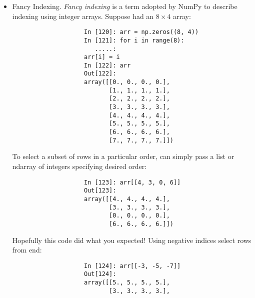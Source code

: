 \documentclass{article}
\newtheorem{remark}{Remark}
\begin{document}
\begin{enumerate}
\begin{itemize}
\begin{itemize}
\begin{itemize}
				\begin{remark}
					Python keywords {\tt and, or} do not work with Boolean arrays. Use {\tt\&} (and) \& {\tt|} (or) instead.
				\end{remark}
				Setting values with Boolean arrays works by substituting value or values on RHS into locations where Boolean array's  values are {\tt True}. To set all of negative value in {\tt data} to 0, need only do:
				\begin{verbatim}
					In [116]: data[data < 0] = 0
					In [117]: data
					Out[117]:
					array([[4, 7],
					       [0, 2],
					       [0, 6],
					       [0, 0],
					       [1, 2],
					       [0, 0],
					       [3, 4]])
				\end{verbatim}
				Can also set whole rows or columns using a 1D Boolean array:
				\begin{verbatim}
					In [118]: data[names != "Joe"] = 7
					In [119]: data
					Out[119]:
					array([[7, 7],
					       [0, 2],
					       [7, 7],
					       [7, 7],
					       [7, 7],
					       [0, 0],
					       [3, 4]])
				\end{verbatim}
				These types of operations on 2D data are convenient to do with pandas.
				\item {\sf Fancy Indexing.} {\it Fancy indexing} is a term adopted by NumPy to describe indexing using integer arrays. Suppose had an $8\times4$ array:
				\begin{verbatim}
					In [120]: arr = np.zeros((8, 4))
					In [121]: for i in range(8):
					   .....:
					arr[i] = i
					In [122]: arr
					Out[122]:
					array([[0., 0., 0., 0.],
					       [1., 1., 1., 1.],
					       [2., 2., 2., 2.],
					       [3., 3., 3., 3.],
					       [4., 4., 4., 4.],
					       [5., 5., 5., 5.],
					       [6., 6., 6., 6.],
					       [7., 7., 7., 7.]])
				\end{verbatim}
				To select a subset of rows in a particular order, can simply pass a list or ndarray of integers specifying desired order:
				\begin{verbatim}
					In [123]: arr[[4, 3, 0, 6]]
					Out[123]:
					array([[4., 4., 4., 4.],
					       [3., 3., 3., 3.],
					       [0., 0., 0., 0.],
					       [6., 6., 6., 6.]])
				\end{verbatim}
				Hopefully this code did what you expected! Using negative indices select rows from end:
				\begin{verbatim}
					In [124]: arr[[-3, -5, -7]]
					Out[124]:
					array([[5., 5., 5., 5.],
					       [3., 3., 3., 3.],

\end{verbatim}
\end{itemize}
\end{itemize}
\end{itemize}
\end{enumerate}
\end{document}
